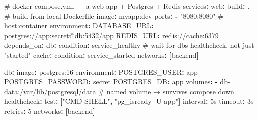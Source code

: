 \documentclass[11pt]{article}
\newenvironment{Shaded}{\begin{snugshade}}{\end{snugshade}}
\newcommand{\AttributeTok}[1]{\textcolor[rgb]{0.16,0.50,0.73}{#1}}
\newcommand{\CommentTok}[1]{\textcolor[rgb]{0.48,0.49,0.49}{#1}}
\newcommand{\DecValTok}[1]{\textcolor[rgb]{0.96,0.45,0.00}{#1}}
\newcommand{\FunctionTok}[1]{\textcolor[rgb]{0.56,0.27,0.68}{#1}}
\newcommand{\KeywordTok}[1]{\textcolor[rgb]{0.81,0.81,0.76}{\textbf{#1}}}
\newcommand{\StringTok}[1]{\textcolor[rgb]{0.96,0.31,0.31}{#1}}
\begin{document}
\begin{Shaded}
\begin{Highlighting}[]
\CommentTok{\# docker{-}compose.yml — a web app + Postgres + Redis}
\FunctionTok{services}\KeywordTok{:}
\AttributeTok{  }\FunctionTok{web}\KeywordTok{:}
\AttributeTok{    }\FunctionTok{build}\KeywordTok{:}\AttributeTok{ .}\CommentTok{                       \# build from local Dockerfile}
\AttributeTok{    }\FunctionTok{image}\KeywordTok{:}\AttributeTok{ myapp:dev}
\AttributeTok{    }\FunctionTok{ports}\KeywordTok{:}
\AttributeTok{      }\KeywordTok{{-}}\AttributeTok{ }\StringTok{"8080:8080"}\CommentTok{                \# host:container}
\AttributeTok{    }\FunctionTok{environment}\KeywordTok{:}
\AttributeTok{      }\FunctionTok{DATABASE\_URL}\KeywordTok{:}\AttributeTok{ postgres://app:secret@db:5432/app}
\AttributeTok{      }\FunctionTok{REDIS\_URL}\KeywordTok{:}\AttributeTok{ redis://cache:6379}
\AttributeTok{    }\FunctionTok{depends\_on}\KeywordTok{:}
\AttributeTok{      }\FunctionTok{db}\KeywordTok{:}
\AttributeTok{        }\FunctionTok{condition}\KeywordTok{:}\AttributeTok{ service\_healthy}\CommentTok{ \# wait for db\textquotesingle{}s healthcheck, not just "started"}
\AttributeTok{      }\FunctionTok{cache}\KeywordTok{:}
\AttributeTok{        }\FunctionTok{condition}\KeywordTok{:}\AttributeTok{ service\_started}
\AttributeTok{    }\FunctionTok{networks}\KeywordTok{:}\AttributeTok{ }\KeywordTok{[}\AttributeTok{backend}\KeywordTok{]}

\AttributeTok{  }\FunctionTok{db}\KeywordTok{:}
\AttributeTok{    }\FunctionTok{image}\KeywordTok{:}\AttributeTok{ postgres:16}
\AttributeTok{    }\FunctionTok{environment}\KeywordTok{:}
\AttributeTok{      }\FunctionTok{POSTGRES\_USER}\KeywordTok{:}\AttributeTok{ app}
\AttributeTok{      }\FunctionTok{POSTGRES\_PASSWORD}\KeywordTok{:}\AttributeTok{ secret}
\AttributeTok{      }\FunctionTok{POSTGRES\_DB}\KeywordTok{:}\AttributeTok{ app}
\AttributeTok{    }\FunctionTok{volumes}\KeywordTok{:}
\AttributeTok{      }\KeywordTok{{-}}\AttributeTok{ db{-}data:/var/lib/postgresql/data}\CommentTok{   \# named volume → survives \textasciigrave{}compose down\textasciigrave{}}
\AttributeTok{    }\FunctionTok{healthcheck}\KeywordTok{:}
\AttributeTok{      }\FunctionTok{test}\KeywordTok{:}\AttributeTok{ }\KeywordTok{[}\StringTok{"CMD{-}SHELL"}\KeywordTok{,}\AttributeTok{ }\StringTok{"pg\_isready {-}U app"}\KeywordTok{]}
\AttributeTok{      }\FunctionTok{interval}\KeywordTok{:}\AttributeTok{ 5s}
\AttributeTok{      }\FunctionTok{timeout}\KeywordTok{:}\AttributeTok{ 3s}
\AttributeTok{      }\FunctionTok{retries}\KeywordTok{:}\AttributeTok{ }\DecValTok{5}
\AttributeTok{    }\FunctionTok{networks}\KeywordTok{:}\AttributeTok{ }\KeywordTok{[}\AttributeTok{backend}\KeywordTok{]}


\end{Highlighting}
\end{Shaded}
\end{document}
